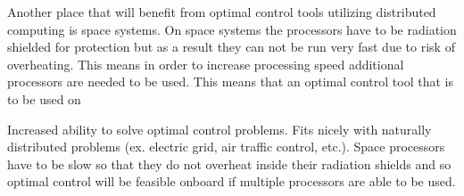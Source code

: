\documentclass[12pt]{article}
\begin{document}
    Another place that will benefit from optimal control tools utilizing
distributed computing is space systems. On space systems the processors
have to be radiation shielded for protection but as a result they can not
be run very fast due to risk of overheating. This means in order to
increase processing speed additional processors are needed to be used. This
means that an optimal control tool that is to be used on 

Increased ability to solve optimal control problems.
Fits nicely with naturally distributed problems (ex. electric grid, air traffic
control, etc.). Space processors have to be slow so that they do not overheat
inside their radiation shields and so optimal control will be feasible onboard
if multiple processors are able to be used.
\end{document}
